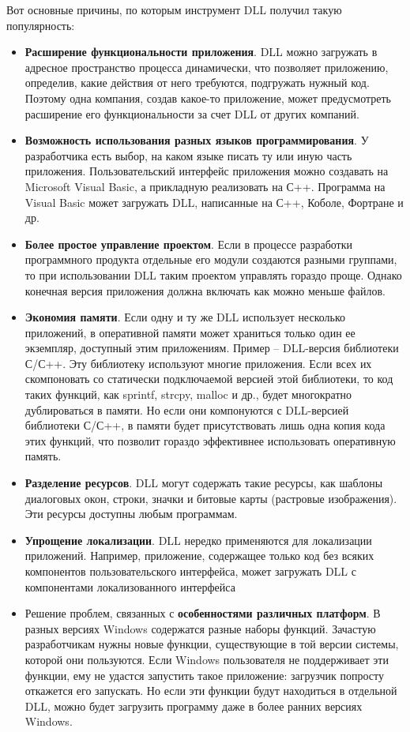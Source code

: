 Вот основные причины, по которым инструмент DLL получил такую популярность:
\begin{itemize}
\item \textbf{Расширение функциональности приложения}. DLL можно загружать в адресное пространство процесса динамически, что позволяет приложению, определив, какие действия от него требуются, подгружать нужный код. Поэтому одна компания, создав какое-то приложение, может предусмотреть расширение его функциональности за счет DLL от других компаний.
\item \textbf{Возможность использования разных языков программирования}. У разработчика есть выбор, на каком языке писать ту или иную часть приложения. Пользовательский интерфейс приложения можно создавать на Microsoft Visual Basic, а прикладную реализовать на С++. Программа на Visual Basic может загружать DLL, написанные на С++, Коболе, Фортране и др.
\item \textbf{Более простое управление проектом}. Если в процессе разработки программного продукта отдельные его модули создаются разными группами, то при использовании DLL таким проектом управлять гораздо проще. Однако конечная версия приложения должна включать как можно меньше файлов.
\item \textbf{Экономия памяти}. Если одну и ту же DLL использует несколько приложений, в оперативной памяти может храниться только один ее экземпляр, доступный этим приложениям. Пример -- DLL-версия библиотеки С/С++. Эту библиотеку используют многие приложения. Если всех их скомпоновать со статически подключаемой версией этой библиотеки, то код таких функций, как sprintf, strcpy, malloc и др., будет многократно дублироваться в памяти. Но если они компонуются с DLL-версией библиотеки С/С++, в памяти будет присутствовать лишь одна копия кода этих функций, что позволит гораздо эффективнее использовать оперативную память.
\item \textbf{Разделение ресурсов}. DLL могут содержать такие ресурсы, как шаблоны диалоговых окон, строки, значки и битовые карты (растровые изображения). Эти ресурсы доступны любым программам.
\item \textbf{Упрощение локализации}. DLL нередко применяются для локализации приложений. Например, приложение, содержащее только код без всяких компонентов пользовательского интерфейса, может загружать DLL с компонентами локализованного интерфейса
\item Решение проблем, связанных с \textbf{особенностями различных платформ}. В разных версиях Windows содержатся разные наборы функций. Зачастую разработчикам нужны новые функции, существующие в той версии системы, которой они пользуются. Если Windows пользователя не поддерживает эти функции, ему не удастся запустить такое приложение: загрузчик попросту откажется его запускать. Но если эти функции будут находиться в отдельной DLL, можно будет загрузить программу даже в более ранних версиях Windows.

\end{itemize}
